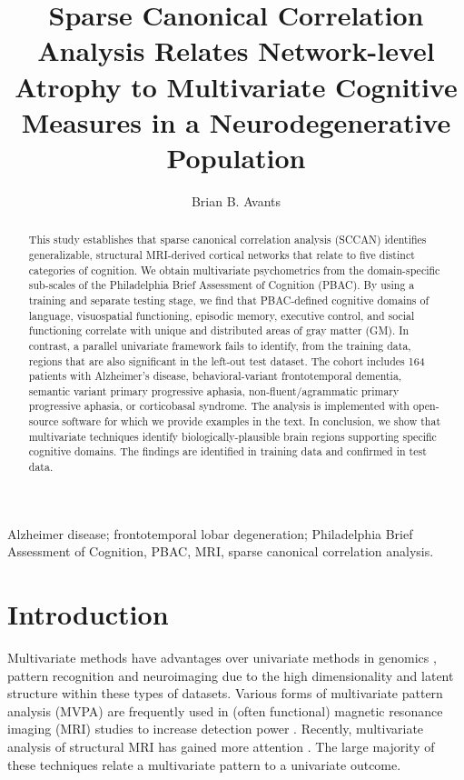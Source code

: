 \documentclass[preprint,authoryear,12pt]{elsarticle}
\begin{document}
\title{Sparse Canonical Correlation Analysis Relates Network-level Atrophy 
to Multivariate Cognitive Measures in a Neurodegenerative Population}
\author{Brian B. Avants}
\begin{abstract}
This study establishes that sparse canonical correlation analysis (SCCAN) identifies generalizable, structural MRI-derived cortical networks that relate to five distinct categories of cognition.  We obtain multivariate psychometrics from the domain-specific sub-scales of the Philadelphia Brief Assessment of Cognition (PBAC).  By using a training and separate testing stage, we find that PBAC-defined cognitive domains of language, visuospatial functioning, episodic memory, executive control, and social functioning correlate with unique and distributed areas of gray matter (GM).  In contrast, a parallel univariate framework fails to identify, from the training data, regions that are also significant in the left-out test dataset. The cohort includes 164 patients with Alzheimer's disease, behavioral-variant frontotemporal dementia, semantic variant primary progressive aphasia, non-fluent/agrammatic primary progressive aphasia, or corticobasal syndrome.  The analysis is implemented with open-source software for which we provide examples in the text.  In conclusion, we show that multivariate techniques identify biologically-plausible brain regions supporting specific cognitive domains.  The findings are identified in training data and confirmed in test data. 
\end{abstract}
\begin{keyword}
Alzheimer disease; frontotemporal lobar degeneration; Philadelphia Brief Assessment of Cognition, PBAC, MRI, sparse canonical correlation analysis.
\end{keyword}
\maketitle


\section{Introduction} 
Multivariate methods have advantages over univariate methods in genomics \citet{Parkhomenko2009,LeFloch2012,Hibar2011}, pattern recognition \citet{Bishop1995,roberts_parametric_1997,Tipping2001} and neuroimaging \citet{McIntosh1996,DeMartino2008,Fan2008,Tosun2012,Shamy2011} due to the high dimensionality and latent structure within these types of datasets.  Various forms of multivariate pattern analysis (MVPA) \citet{Norman2006,Habeck2008,Hanke2009,Kloppel2008681,Stonnington2010} are frequently used in (often functional) magnetic resonance imaging (MRI) studies to increase detection power  \citet{McIntosh1996,Norman2006,OToole2007,Yamashita2008}.  Recently, multivariate analysis of structural MRI has gained more attention \citet{Ryali2010,Grosenick2013,Sabuncu2011}.  The large majority of these techniques relate a multivariate pattern to a univariate outcome.  
\end{document}
